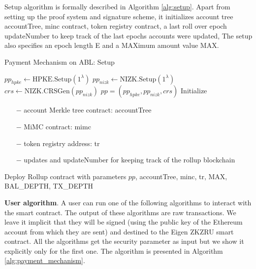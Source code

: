 \documentclass{article}
\begin{document}
Setup algorithm is formally described in Algorithm \ref{alg:setup}. Apart from setting up the proof system and signature scheme, it initializes account tree accountTree, minc contract, token registry contract, a last roll over epoch updateNumber to keep track of the last epochs accounts were updated, The setup also specifies an epoch length E and a \mbox{MAX}imum amount value \mbox{MAX}.

\begin{algorithm}
 \caption{Payment Mechanism on ABL: Setup}
    \label{alg:setup}
    \LinesNumbered
    
    $pp_{hpke} \gets \mbox{HPKE.Setup}(1^\lambda)$ \;
    $pp_{nizk} \gets \mbox{NIZK.Setup}(1^\lambda)$ \;
    $crs \gets \mbox{NIZK.CRSGen}(pp_{nizk})$ \;
    $pp = (pp_{hpke}, pp_{nizk}, crs)$ \;
    Initialize {
        \begin{itemize}
            \item[$-$] account Merkle tree contract: accountTree
            \item[$-$] MiMC contract: mimc
            \item[$-$] token registry address: tr
            \item[$-$] updates and updateNumber for keeping track of the rollup blockchain
        \end{itemize}
    }
    Deploy Rollup contract with parameters $pp$, accountTree, minc, tr, \mbox{MAX}, BAL\_DEPTH, TX\_DEPTH
    
\end{algorithm}

\textbf{User algorithm}. A user can run one of the following algorithms to interact with the smart contract. The output of these algorithms are raw transactions. We leave it implicit that they will be signed (using the public key of the Ethereum account from which they are sent) and destined to the Eigen ZKZRU smart contract. All the algorithms get the security parameter as input but we show it explicitly only for the first one. The algorithm is presented in 
Algorithm \ref{alg:payment_mechanism}.
\end{document}
